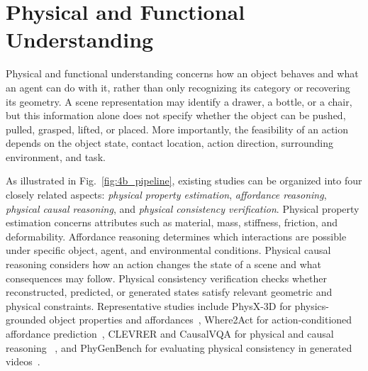 \documentclass{SCIS2026}
\begin{document}


\section{Physical and Functional Understanding}
\label{sec:physical_functional}

Physical and functional understanding concerns how an object behaves and
what an agent can do with it, rather than only recognizing its category or
recovering its geometry. A scene representation may identify a drawer, a
bottle, or a chair, but this information alone does not specify whether the
object can be pushed, pulled, grasped, lifted, or placed. More importantly,
the feasibility of an action depends on the object state, contact location,
action direction, surrounding environment, and task.

As illustrated in Fig.~\ref{fig:4b_pipeline}, existing studies can be
organized into four closely related aspects: \emph{physical property
estimation}, \emph{affordance reasoning}, \emph{physical causal reasoning},
and \emph{physical consistency verification}. Physical property estimation
concerns attributes such as material, mass, stiffness, friction, and
deformability. Affordance reasoning determines which interactions are
possible under specific object, agent, and environmental conditions.
Physical causal reasoning considers how an action changes the state of a
scene and what consequences may follow. Physical consistency verification
checks whether reconstructed, predicted, or generated states satisfy relevant
geometric and physical constraints. Representative studies include PhysX-3D
for physics-grounded object properties and affordances~\cite{cao2025physx3d},
Where2Act for action-conditioned affordance prediction~\cite{mo2021where2act},
CLEVRER and CausalVQA for physical and causal reasoning
~\cite{yi2019clevrer,foss2025causalvqa}, and PhyGenBench for evaluating
physical consistency in generated videos~\cite{meng2024towards}.
\end{document}

